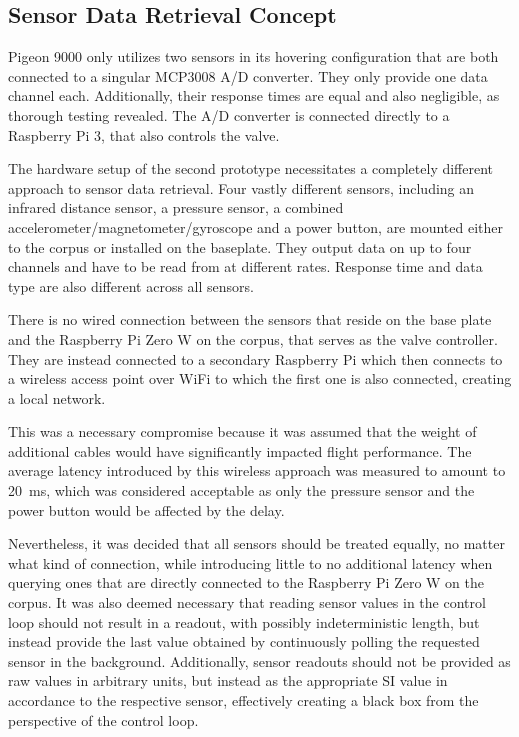 \subsection{Sensor Data Retrieval Concept}
Pigeon 9000 only utilizes two sensors in its hovering configuration that are both connected to a singular MCP3008 A/D converter. They only provide one data channel each. Additionally, their response times are equal and also negligible, as thorough testing revealed. The A/D converter is connected directly to a Raspberry Pi 3, that also controls the valve.

The hardware setup of the second prototype necessitates a completely different approach to sensor data retrieval. Four vastly different sensors, including an infrared distance sensor, a pressure sensor, a combined accelerometer/magnetometer/gyroscope and a power button, are mounted either to the corpus or installed on the baseplate. They output data on up to four channels and have to be read from at different rates. Response time and data type are also different across all sensors. 

There is no wired connection between the sensors that reside on the base plate and the Raspberry Pi Zero W on the corpus, that serves as the valve controller. They are instead connected to a secondary Raspberry Pi which then connects to a wireless access point over WiFi to which the first one is also connected, creating a local network. 

This was a necessary compromise because it was assumed that the weight of additional cables would have significantly impacted flight performance. The average latency introduced by this wireless approach was measured to amount to \SI{20}{\milli\second}, which was considered acceptable as only the pressure sensor and the power button would be affected by the delay.

Nevertheless, it was decided that all sensors should be treated equally, no matter what kind of connection, while introducing little to no additional latency when querying ones that are directly connected to the Raspberry Pi Zero W on the corpus. 
It was also deemed necessary that reading sensor values in the control loop should not result in a readout, with possibly indeterministic length, but instead provide the last value obtained by continuously polling the requested sensor in the background. 
Additionally, sensor readouts should not be provided as raw values in arbitrary units, but instead as the appropriate SI value in accordance to the respective sensor, effectively creating a black box from the perspective of the control loop. 

